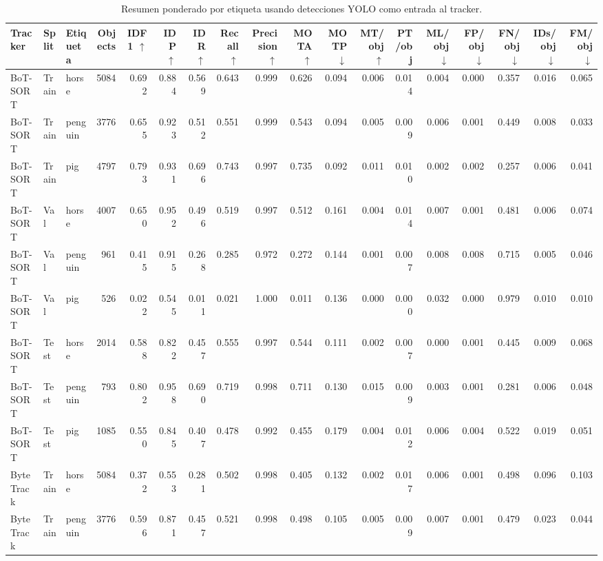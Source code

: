 \begin{table}
\caption{Resumen ponderado por etiqueta usando detecciones YOLO como entrada al tracker.}
\label{tab:tracking_yolo_by_class_summary}
\begin{tabular}{lllrrrrrrrrrrrrrrr}
\toprule
Tracker & Split & Etiqueta & Objects & IDF1 $\uparrow$ & IDP $\uparrow$ & IDR $\uparrow$ & Recall $\uparrow$ & Precision $\uparrow$ & MOTA $\uparrow$ & MOTP $\downarrow$ & MT/obj $\uparrow$ & PT/obj & ML/obj $\downarrow$ & FP/obj $\downarrow$ & FN/obj $\downarrow$ & IDs/obj $\downarrow$ & FM/obj $\downarrow$ \\
\midrule
BoT-SORT & Train & horse & 5084 & 0.692 & 0.884 & 0.569 & 0.643 & 0.999 & 0.626 & 0.094 & 0.006 & 0.014 & 0.004 & 0.000 & 0.357 & 0.016 & 0.065 \\
BoT-SORT & Train & penguin & 3776 & 0.655 & 0.923 & 0.512 & 0.551 & 0.999 & 0.543 & 0.094 & 0.005 & 0.009 & 0.006 & 0.001 & 0.449 & 0.008 & 0.033 \\
BoT-SORT & Train & pig & 4797 & 0.793 & 0.931 & 0.696 & 0.743 & 0.997 & 0.735 & 0.092 & 0.011 & 0.010 & 0.002 & 0.002 & 0.257 & 0.006 & 0.041 \\
BoT-SORT & Val & horse & 4007 & 0.650 & 0.952 & 0.496 & 0.519 & 0.997 & 0.512 & 0.161 & 0.004 & 0.014 & 0.007 & 0.001 & 0.481 & 0.006 & 0.074 \\
BoT-SORT & Val & penguin & 961 & 0.415 & 0.915 & 0.268 & 0.285 & 0.972 & 0.272 & 0.144 & 0.001 & 0.007 & 0.008 & 0.008 & 0.715 & 0.005 & 0.046 \\
BoT-SORT & Val & pig & 526 & 0.022 & 0.545 & 0.011 & 0.021 & 1.000 & 0.011 & 0.136 & 0.000 & 0.000 & 0.032 & 0.000 & 0.979 & 0.010 & 0.010 \\
BoT-SORT & Test & horse & 2014 & 0.588 & 0.822 & 0.457 & 0.555 & 0.997 & 0.544 & 0.111 & 0.002 & 0.007 & 0.000 & 0.001 & 0.445 & 0.009 & 0.068 \\
BoT-SORT & Test & penguin & 793 & 0.802 & 0.958 & 0.690 & 0.719 & 0.998 & 0.711 & 0.130 & 0.015 & 0.009 & 0.003 & 0.001 & 0.281 & 0.006 & 0.048 \\
BoT-SORT & Test & pig & 1085 & 0.550 & 0.845 & 0.407 & 0.478 & 0.992 & 0.455 & 0.179 & 0.004 & 0.012 & 0.006 & 0.004 & 0.522 & 0.019 & 0.051 \\
ByteTrack & Train & horse & 5084 & 0.372 & 0.553 & 0.281 & 0.502 & 0.998 & 0.405 & 0.132 & 0.002 & 0.017 & 0.006 & 0.001 & 0.498 & 0.096 & 0.103 \\
ByteTrack & Train & penguin & 3776 & 0.596 & 0.871 & 0.457 & 0.521 & 0.998 & 0.498 & 0.105 & 0.005 & 0.009 & 0.007 & 0.001 & 0.479 & 0.023 & 0.044 \\

\end{tabular}
\end{table}
